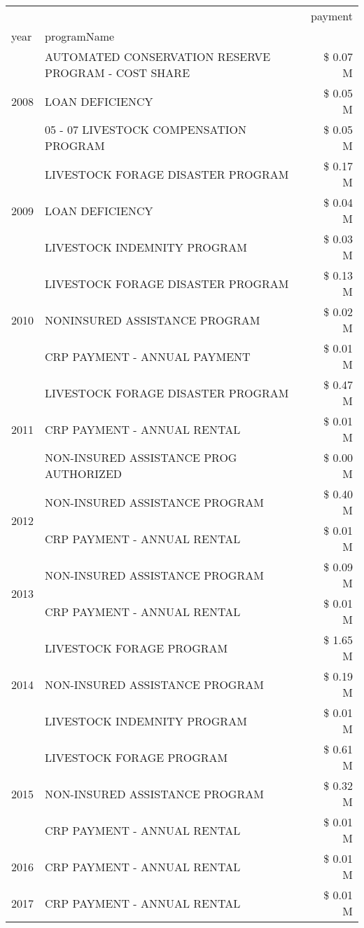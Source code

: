 \begin{tabular}{llr}
\toprule
 &  & payment \\
year & programName &  \\
\midrule
\multirow[t]{3}{*}{2008} & AUTOMATED CONSERVATION RESERVE PROGRAM - COST SHARE & \$ 0.07 M \\
 & LOAN DEFICIENCY & \$ 0.05 M \\
 & 05 - 07 LIVESTOCK COMPENSATION PROGRAM & \$ 0.05 M \\
\cline{1-3}
\multirow[t]{3}{*}{2009} & LIVESTOCK FORAGE DISASTER  PROGRAM & \$ 0.17 M \\
 & LOAN DEFICIENCY & \$ 0.04 M \\
 & LIVESTOCK INDEMNITY PROGRAM & \$ 0.03 M \\
\cline{1-3}
\multirow[t]{3}{*}{2010} & LIVESTOCK FORAGE DISASTER  PROGRAM & \$ 0.13 M \\
 & NONINSURED ASSISTANCE PROGRAM & \$ 0.02 M \\
 & CRP PAYMENT - ANNUAL PAYMENT & \$ 0.01 M \\
\cline{1-3}
\multirow[t]{3}{*}{2011} & LIVESTOCK FORAGE DISASTER PROGRAM & \$ 0.47 M \\
 & CRP PAYMENT - ANNUAL RENTAL & \$ 0.01 M \\
 & NON-INSURED ASSISTANCE PROG AUTHORIZED & \$ 0.00 M \\
\cline{1-3}
\multirow[t]{2}{*}{2012} & NON-INSURED ASSISTANCE PROGRAM & \$ 0.40 M \\
 & CRP PAYMENT - ANNUAL RENTAL & \$ 0.01 M \\
\cline{1-3}
\multirow[t]{2}{*}{2013} & NON-INSURED ASSISTANCE PROGRAM & \$ 0.09 M \\
 & CRP PAYMENT - ANNUAL RENTAL & \$ 0.01 M \\
\cline{1-3}
\multirow[t]{3}{*}{2014} & LIVESTOCK FORAGE PROGRAM & \$ 1.65 M \\
 & NON-INSURED ASSISTANCE PROGRAM & \$ 0.19 M \\
 & LIVESTOCK INDEMNITY PROGRAM & \$ 0.01 M \\
\cline{1-3}
\multirow[t]{3}{*}{2015} & LIVESTOCK FORAGE PROGRAM & \$ 0.61 M \\
 & NON-INSURED ASSISTANCE PROGRAM & \$ 0.32 M \\
 & CRP PAYMENT - ANNUAL RENTAL & \$ 0.01 M \\
\cline{1-3}
2016 & CRP PAYMENT - ANNUAL RENTAL & \$ 0.01 M \\
\cline{1-3}
2017 & CRP PAYMENT - ANNUAL RENTAL & \$ 0.01 M \\

\end{tabular}
